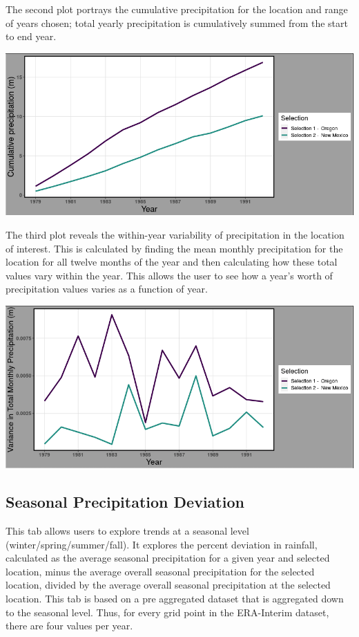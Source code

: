 \documentclass[10pt,letterpaper]{article}
\begin{document}
The second plot portrays the cumulative precipitation for the location and range of years chosen; total yearly precipitation is cumulatively summed from the start to end year.

\begin{center}
  \includegraphics[width = .8\textwidth]{graphics/cumulative_year}
\end{center}

The third plot reveals the within-year variability of precipitation in the location of interest. This is calculated by finding the mean monthly precipitation for the location for all twelve months of the year and then calculating how these total values vary within the year. This allows the user to see how a year’s worth of precipitation values varies as a function of year.

\begin{center}
  \includegraphics[width = .8\textwidth]{graphics/variance}
\end{center}

\subsection*{Seasonal Precipitation Deviation}

This tab allows users to explore trends at a seasonal level (winter/spring/summer/fall).  It explores the percent deviation in rainfall, calculated as the average seasonal precipitation for a given year and selected location, minus the average overall seasonal precipitation for the selected location, divided by the average overall seasonal precipitation at the selected location.  This tab is based on a pre aggregated dataset that is aggregated down to the seasonal level. Thus, for every grid point in the ERA-Interim dataset, there are four values per year.
\end{document}
